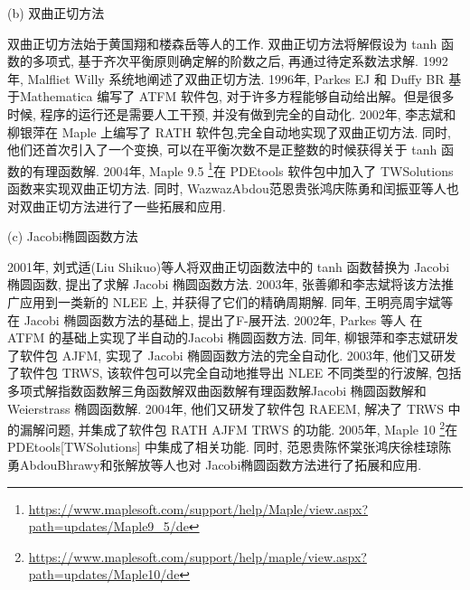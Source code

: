 (b) 双曲正切方法 

双曲正切方法始于黄国翔和楼森岳等人\cite{huang1989exact}的工作. 双曲正切方法将解假设为 tanh 函数的多项式, 基于齐次平衡原则确定解的阶数之后, 再通过待定系数法求解. 1992年, Malfliet Willy \cite{malfliet1992solitary}系统地阐述了双曲正切方法. 1996年, Parkes EJ 和 Duffy BR \cite{parkes1996automated}基于Mathematica 编写了 ATFM 软件包, 对于许多方程能够自动给出解。但是很多时候, 程序的运行还是需要人工干预, 并没有做到完全的自动化. 2002年, 李志斌和柳银萍\cite{liu2001master,li2002rath}在 Maple 上编写了 RATH 软件包,完全自动地实现了双曲正切方法. 同时, 他们还首次引入了一个变换, 可以在平衡次数不是正整数的时候获得关于 tanh 函数的有理函数解. 2004年, Maple 9.5 \footnote{\url{https://www.maplesoft.com/support/help/Maple/view.aspx?path=updates/Maple9_5/de}}在 PDEtools 软件包中加入了 TWSolutions 函数来实现双曲正切方法. 同时, Wazwaz\cite{wazwaz2004tanh}\D Abdou\cite{abdou2007extended}\D 范恩贵\cite{fan2000extended}\D 张鸿庆\cite{lu2003further}\D 陈勇\cite{zheng2003generalized}和闰振亚\cite{yan2001new}等人也对双曲正切方法进行了一些拓展和应用. 

(c) Jacobi椭圆函数方法

2001年, 刘式适(Liu Shikuo)等人\cite{liu2001jacobi}将双曲正切函数法中的 tanh 函数替换为 Jacobi 椭圆函数, 提出了求解 Jacobi 椭圆函数方法. 2003年, 张善卿和李志斌\cite{zhang2003jacobi}将该方法推广应用到一类新的 NLEE 上, 并获得了它们的精确周期解. 同年, 王明亮\D 周宇斌等\cite{zhou2003periodic}在 Jacobi 椭圆函数方法的基础上, 提出了F-展开法. 2002年, Parkes 等人\cite{parkes2002jacobi} 在 ATFM 的基础上实现了半自动的Jacobi 椭圆函数方法. 同年, 柳银萍和李志斌\cite{yin2002automated}研发了软件包 AJFM, 实现了 Jacobi 椭圆函数方法的完全自动化. 2003年, 他们\cite{yin2003automated}又研发了软件包 TRWS, 该软件包可以完全自动地推导出 NLEE 不同类型的行波解, 包括多项式解\D 指数函数解\D 三角函数解\D 双曲函数解\D 有理函数解\D Jacobi 椭圆函数解和 Weierstrass 椭圆函数解. 2004年, 他们\cite{li2004raeem}又研发了软件包 RAEEM, 解决了 TRWS 中的漏解问题, 并集成了软件包 RATH \D AJFM \D TRWS 的功能. 2005年, Maple 10 \footnote{\url{https://www.maplesoft.com/support/help/maple/view.aspx?path=updates/Maple10/de}}在 PDEtools[TWSolutions] 中集成了相关功能. 同时, 范恩贵\cite{fan2002applications}\D 陈怀棠\cite{chen2003improved}\D 张鸿庆\cite{wang2005new,yu2005extended}\D 徐桂琼\cite{gui2005applications}\D 陈勇\cite{chen2005extended}\D Abdou\cite{abdou2007construction}\D Bhrawy\cite{bhrawy2013cnoidal}和张解放\cite{jia2004general,chao2005symbolic}等人也对 Jacobi椭圆函数方法进行了拓展和应用. 

